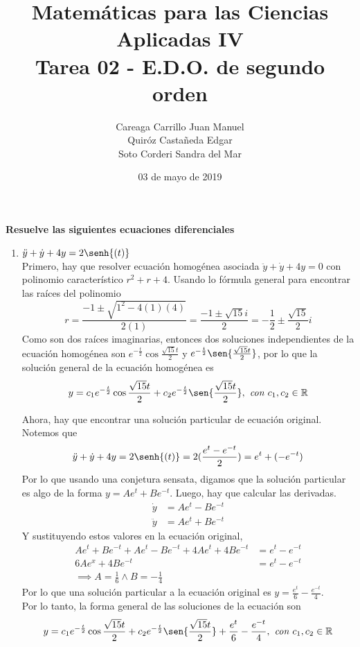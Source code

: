 \documentclass{article}
\title{
    Matemáticas para las Ciencias Aplicadas IV\\
    Tarea 02 - E.D.O. de segundo orden
}
\author{
    Careaga Carrillo Juan Manuel \\
    Quiróz Castañeda Edgar \\
    Soto Corderi Sandra del Mar
}
\date{
    03 de mayo de 2019
}
\begin{document}
    \maketitle
    {\bf Resuelve las siguientes ecuaciones diferenciales}
    \begin{enumerate}
        \item {
            $\ddot y+\dot y+4y=2\senh{(t)}$\\
            \color{azul}
            Primero, hay que resolver ecuación homogénea asociada
            $\ddot y+\dot y+4y=0$ con polinomio característico
            $r^2+r+4$.
            Usando lo fórmula general para encontrar las raíces del polinomio
            \[
            r = \frac{-1\pm\sqrt{1^2-4(1)(4)}}{2(1)} =
            \frac{-1\pm\sqrt{15}i}{2} =
            -\frac{1}{2}\pm\frac{\sqrt{15}}{2}i
            \]
            Como son dos raíces imaginarias, entonces dos soluciones
            independientes de la ecuación
            homogénea son $e^{-\frac{t}{2}}\cos{\frac{\sqrt{15}t}{2}}$ 
            y $e^{-\frac{t}{2}}\sen{\frac{\sqrt{15}t}{2}}$, por lo que 
            la solución general de la ecuación homogénea es
            \[y = c_1e^{-\frac{t}{2}}\cos{\frac{\sqrt{15}t}{2}} + 
            c_2e^{-\frac{t}{2}}\sen{\frac{\sqrt{15}t}{2}}, \textit{ con } c_1, c_2 \in \mathbb{R}\]
            
            Ahora, hay que encontrar una solución particular de ecuación
            original. Notemos que
            \[
            \ddot y+\dot y+4y=2\senh{(t)} = 
            2(\frac{e^t-e^{-t}}{2}) = 
            e^t+ (-e^{-t})
            \]
            Por lo que usando una conjetura sensata, digamos que la
            solución particular es algo de la forma $y=Ae^t+Be^{-t}$.
            Luego, hay que calcular las derivadas.
            \begin{align*}
                \dot y &= Ae^t-Be^{-t} \\
                \ddot y &= Ae^t+Be^{-t}
            \end{align*}
            Y sustituyendo estos valores en la ecuación original, 
            \begin{align*}
                 Ae^t+Be^{-t} + Ae^t-Be^{-t} + 4Ae^t+4Be^{-t} &= 
                 e^t-e^{-t}\\
                 6Ae^x+4Be^{-t} &=e^t-e^{-t} \\
                 \implies A = \frac{1}{6} \land B = -\frac{1}{4}
            \end{align*}
            Por lo que una solución particular a la ecuación original
            es $y = \frac{e^t}{6}-\frac{e^{-t}}{4}$. \\
            Por lo tanto, la forma general de las soluciones de la 
            ecuación son 
            \[y = c_1e^{-\frac{t}{2}}\cos{\frac{\sqrt{15}t}{2}} + 
            c_2e^{-\frac{t}{2}}\sen{\frac{\sqrt{15}t}{2}} +
            \frac{e^t}{6}-\frac{e^{-t}}{4}, \textit{ con } 
            c_1, c_2 \in \mathbb{R}\]
            
}
\end{enumerate}
\end{document}
